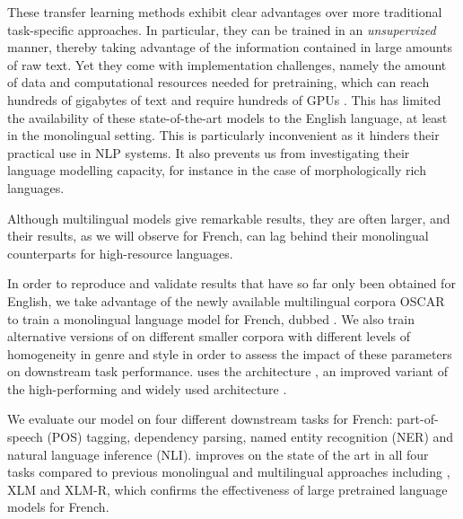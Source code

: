 These transfer learning methods exhibit clear advantages over more traditional task-specific approaches. In particular, they can be trained in an \emph{unsupervized} manner, thereby taking advantage of the information contained in large amounts of raw text.
Yet they come with implementation challenges, namely the amount of data and computational resources needed for pretraining, which can reach hundreds of gigabytes of text and require hundreds of GPUs \citep{yang-etal-2019-xlnet,liu-etal-2019-roberta}. This has limited the availability of these state-of-the-art models to the English language, at least in the monolingual setting. This is particularly inconvenient as it hinders their practical use in NLP systems. It also prevents us from investigating their language modelling capacity, for instance in the case of morphologically rich languages.

Although multilingual models give remarkable results, they are often larger, and their results, as we will observe for French, can lag behind their monolingual counterparts for high-resource languages. %

In order to reproduce and validate results that have so far only been obtained for English, we take advantage of the newly available multilingual corpora OSCAR \cite{ortiz-suarez-etal-2019-asynchronous} to train a monolingual language model for French, dubbed \camembert. We also train alternative versions of \camembert on different smaller corpora with different levels of homogeneity in genre and style in order to assess the impact of these parameters on downstream task performance.
\camembert uses the \roberta architecture \cite{liu-etal-2019-roberta}, an improved variant of the high-performing and widely used \bert architecture \cite{devlin-etal-2019-bert}.

We evaluate our model on four different downstream tasks for French: part-of-speech (POS) tagging, dependency parsing, named entity recognition (NER) and natural language inference (NLI).
\camembert improves on the state of the art in all four tasks compared to previous monolingual and multilingual approaches including \mbert, XLM and XLM-R, which confirms the effectiveness of large pretrained language models for French.

